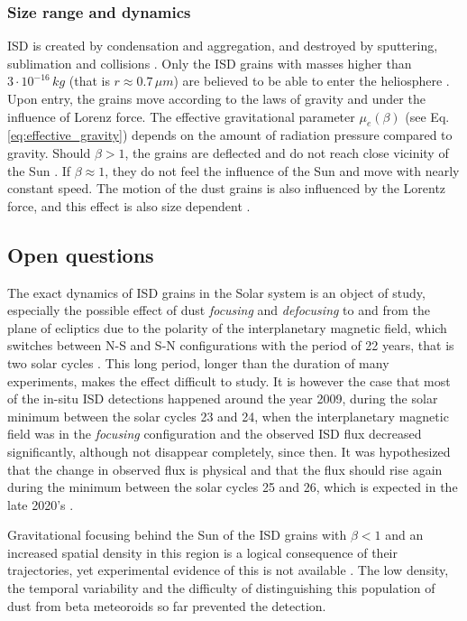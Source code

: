 \subsubsection{Size range and dynamics}

ISD is created by condensation and aggregation, and destroyed by sputtering, sublimation and collisions \citep{mann2010interstellar}. Only the ISD grains with masses higher than $3\cdot 10^{-16} \, \si{kg}$ (that is $r \approx 0.7 \, \si{\mu m} $) are believed to be able to enter the heliosphere \citep{kimura1998electric}. Upon entry, the grains move according to the laws of gravity and under the influence of Lorenz force. The effective gravitational parameter $\mu_e(\beta)$ (see Eq. \ref{eq:effective_gravity}) depends on the amount of radiation pressure compared to gravity. Should $\beta > 1$, the grains are deflected and do not reach close vicinity of the Sun \citep{henriksen2022interstellar}. If $\beta \approx 1$, they do not feel the influence of the Sun and move with nearly constant speed. The motion of the dust grains is also influenced by the Lorentz force, and this effect is also size dependent \cite{morfill1979motion}.

\subsection{Open questions}

The exact dynamics of ISD grains in the Solar system is an object of study, especially the possible effect of dust \textit{focusing} and \textit{defocusing} to and from the plane of ecliptics due to the polarity of the interplanetary magnetic field, which switches between N-S and S-N configurations with the period of 22 years, that is two solar cycles \citep{morfill1979motion}. This long period, longer than the duration of many experiments, makes the effect difficult to study. It is however the case that most of the in-situ ISD detections happened around the year 2009, during the solar minimum between the solar cycles 23 and 24, when the interplanetary magnetic field was in the \textit{focusing} configuration \citep{babic2022situ} and the observed ISD flux decreased significantly, although not disappear completely, since then. It was hypothesized that the change in observed flux is physical and that the flux should rise again during the minimum between the solar cycles 25 and 26, which is expected in the late 2020's \citep{mann2010interstellar}. 

Gravitational focusing behind the Sun of the ISD grains with $\beta < 1$ and an increased spatial density in this region is a logical consequence of their trajectories, yet experimental evidence of this is not available \citep{mann2010interstellar}. The low density, the temporal variability and the difficulty of distinguishing this population of dust from beta meteoroids so far prevented the detection.


